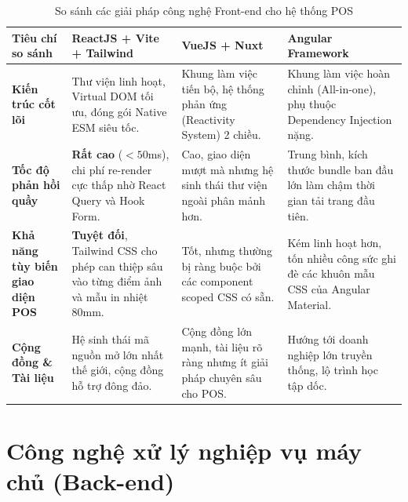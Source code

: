 \begin{table}[htbp]
\centering
\caption{So sánh các giải pháp công nghệ Front-end cho hệ thống POS}
\label{tab:so_sanh_frontend}
\vspace{2mm}
\begin{tabularx}{\textwidth}{|p{3cm}|X|X|X|}
\hline
\textbf{Tiêu chí so sánh} & \textbf{ReactJS + Vite + Tailwind} & \textbf{VueJS + Nuxt} & \textbf{Angular Framework} \\ \hline
\textbf{Kiến trúc cốt lõi} & Thư viện linh hoạt, Virtual DOM tối ưu, đóng gói Native ESM siêu tốc. & Khung làm việc tiến bộ, hệ thống phản ứng (Reactivity System) 2 chiều. & Khung làm việc hoàn chỉnh (All-in-one), phụ thuộc Dependency Injection nặng. \\ \hline
\textbf{Tốc độ phản hồi quầy} & \textbf{Rất cao} ($< 50$ms), chi phí re-render cực thấp nhờ React Query và Hook Form. & Cao, giao diện mượt mà nhưng hệ sinh thái thư viện ngoài phân mảnh hơn. & Trung bình, kích thước bundle ban đầu lớn làm chậm thời gian tải trang đầu tiên. \\ \hline
\textbf{Khả năng tùy biến giao diện POS} & \textbf{Tuyệt đối}, Tailwind CSS cho phép can thiệp sâu vào từng điểm ảnh và mẫu in nhiệt 80mm. & Tốt, nhưng thường bị ràng buộc bởi các component scoped CSS có sẵn. & Kém linh hoạt hơn, tốn nhiều công sức ghi đè các khuôn mẫu CSS của Angular Material. \\ \hline
\textbf{Cộng đồng \& Tài liệu} & Hệ sinh thái mã nguồn mở lớn nhất thế giới, cộng đồng hỗ trợ đông đảo. & Cộng đồng lớn mạnh, tài liệu rõ ràng nhưng ít giải pháp chuyên sâu cho POS. & Hướng tới doanh nghiệp lớn truyền thống, lộ trình học tập dốc. \\ \hline
\end{tabularx}
\end{table}

\section{Công nghệ xử lý nghiệp vụ máy chủ (Back-end)}
\label{sec:cong_nghe_backend}

